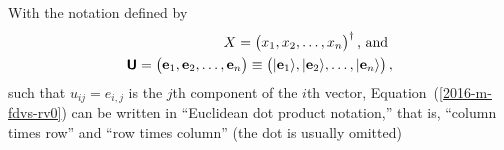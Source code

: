 With the notation
defined by
\begin{equation}
\begin{split} X = \begin{pmatrix}
x_1, x_2, \ldots , x_n
\end{pmatrix}^\dagger
\textrm{, and }
\\
\textsf{\textbf{U}} =
\begin{pmatrix}{\bf e}_1,{\bf e}_2, \ldots , {\bf e}_n\end{pmatrix}
\equiv
\begin{pmatrix} \vert {\bf e}_1\rangle ,\vert {\bf e}_2 \rangle ,  \ldots , \vert {\bf e}_n\rangle \end{pmatrix}
,
\label{2016-m-fdvs-not}
\end{split}
\end{equation}
such that  $u_{ij} = e_{i,j}$ is the $j$th component of the $i$th vector,
Equation~(\ref{2016-m-fdvs-rv0}) can be written
in ``Euclidean dot product notation,''
that is,
``column times row''
and
``row times column'' (the dot is usually omitted)
